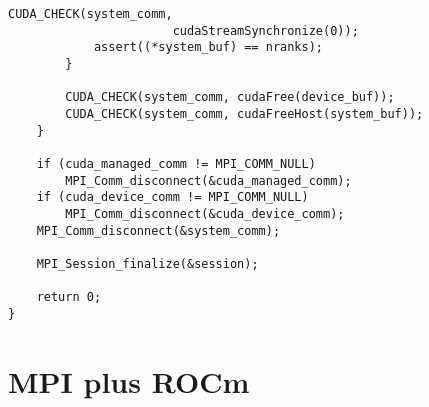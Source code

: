 \begin{example}
\begin{lstlisting}[language={[MPI]C}]
            CUDA_CHECK(system_comm,
                       cudaStreamSynchronize(0));
            assert((*system_buf) == nranks);
        }

        CUDA_CHECK(system_comm, cudaFree(device_buf));
        CUDA_CHECK(system_comm, cudaFreeHost(system_buf));
    }

    if (cuda_managed_comm != MPI_COMM_NULL)
        MPI_Comm_disconnect(&cuda_managed_comm);
    if (cuda_device_comm != MPI_COMM_NULL)
        MPI_Comm_disconnect(&cuda_device_comm);
    MPI_Comm_disconnect(&system_comm);

    MPI_Session_finalize(&session);

    return 0;
}
\end{lstlisting}
\end{example}

\section{MPI plus ROCm}

